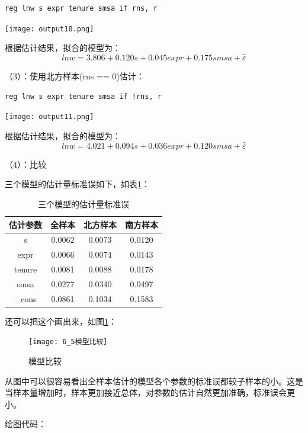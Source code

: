 \documentclass[cn,fancy,blue,11pt]{elegantbook}
\begin{document}
\begin{lstlisting}
reg lnw s expr tenure smsa if rns, r
\end{lstlisting}

\noindent\texttt{[image: output10.png]}

根据估计结果，拟合的模型为：
\begin{equation}
  lnw = 3.806 + 0.120s + 0.045expr + 0.175smsa +\hat{\varepsilon}
\end{equation}

（3）：使用北方样本(rns == 0)估计：

\begin{lstlisting}
reg lnw s expr tenure smsa if !rns, r
\end{lstlisting}

\noindent\texttt{[image: output11.png]}

根据估计结果，拟合的模型为：
\begin{equation}
  lnw = 4.021 + 0.094s + 0.036expr + 0.120smsa +\hat{\varepsilon}
\end{equation}

（4）：比较

三个模型的估计量标准误如下，如表\ref{tab:table1}：

\begin{table}[htbp]
  \centering
  \caption{三个模型的估计量标准误}
  \label{tab:table1}
  \begin{tabular}{cccc}
    \toprule
    估计参数 & 全样本 & 北方样本 & 南方样本\tabularnewline
    \midrule
    s & 0.0062 & 0.0073 & 0.0120\tabularnewline
    expr & 0.0066 & 0.0074 & 0.0143\tabularnewline
    tenure & 0.0081 & 0.0088 & 0.0178\tabularnewline
    smsa & 0.0277 & 0.0340 & 0.0497\tabularnewline
    \_cons & 0.0861 & 0.1034 & 0.1583\tabularnewline
    \bottomrule
  \end{tabular}
\end{table}

还可以把这个画出来，如图\ref{fig:pic65}：

\begin{figure}
  \centering
  \texttt{[image: 6\_5模型比较]}
  \caption{模型比较}
  \label{fig:pic65}
\end{figure}

从图中可以很容易看出全样本估计的模型各个参数的标准误都较子样本的小。这是当样本量增加时，样本更加接近总体，对参数的估计自然更加准确，标准误会更小。

绘图代码：
\end{document}
